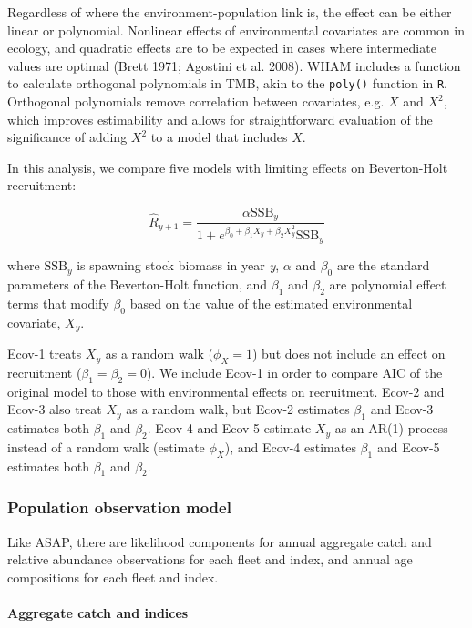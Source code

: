 \documentclass[]{article}
\let\oldparagraph\paragraph
\renewcommand{\paragraph}[1]{\oldparagraph{#1}\mbox{}}
\begin{document}
Regardless of where the environment-population link is, the effect can
be either linear or polynomial. Nonlinear effects of environmental
covariates are common in ecology, and quadratic effects are to be
expected in cases where intermediate values are optimal (Brett 1971;
Agostini et al. 2008). WHAM includes a function to calculate orthogonal
polynomials in TMB, akin to the \texttt{poly()} function in \texttt{R}.
Orthogonal polynomials remove correlation between covariates, e.g. \(X\)
and \(X^2\), which improves estimability and allows for straightforward
evaluation of the significance of adding \(X^2\) to a model that
includes \(X\).

In this analysis, we compare five models with limiting effects on
Beverton-Holt recruitment:

\[\hat{R}_{y+1} = \frac{\alpha \text{SSB}_{y}}{1 + e^{\beta_0 + \beta_1 X_{y} + \beta_2 X^2_{y}} \text{SSB}_y}\]

where \(\text{SSB}_y\) is spawning stock biomass in year \emph{y},
\(\alpha\) and \(\beta_0\) are the standard parameters of the
Beverton-Holt function, and \(\beta_1\) and \(\beta_2\) are polynomial
effect terms that modify \(\beta_0\) based on the value of the estimated
environmental covariate, \(X_y\).

Ecov-1 treats \(X_y\) as a random walk (\(\phi_X = 1\)) but does not
include an effect on recruitment (\(\beta_1 = \beta_2 = 0\)). We include
Ecov-1 in order to compare AIC of the original model to those with
environmental effects on recruitment. Ecov-2 and Ecov-3 also treat
\(X_y\) as a random walk, but Ecov-2 estimates \(\beta_1\) and Ecov-3
estimates both \(\beta_1\) and \(\beta_2\). Ecov-4 and Ecov-5 estimate
\(X_y\) as an AR(1) process instead of a random walk (estimate
\(\phi_X\)), and Ecov-4 estimates \(\beta_1\) and Ecov-5 estimates both
\(\beta_1\) and \(\beta_2\).

\hypertarget{population-observation-model}{%
\subsubsection{Population observation
model}\label{population-observation-model}}

Like ASAP, there are likelihood components for annual aggregate catch
and relative abundance observations for each fleet and index, and annual
age compositions for each fleet and index.

\hypertarget{aggregate-catch-and-indices}{%
\paragraph{Aggregate catch and
indices}\label{aggregate-catch-and-indices}}
\end{document}
